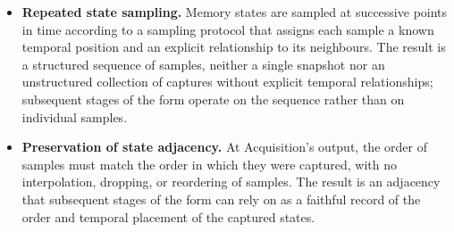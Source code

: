   \begin{itemize}
    \item \textbf{Repeated state sampling.} Memory states are sampled at successive points in time according to a sampling protocol that assigns each sample a known temporal position and an explicit relationship to its neighbours. The result is a structured sequence of samples, neither a single snapshot nor an unstructured collection of captures without explicit temporal relationships; subsequent stages of the form operate on the sequence rather than on individual samples.
    \item \textbf{Preservation of state adjacency.} At Acquisition's output, the order of samples must match the order in which they were captured, with no interpolation, dropping, or reordering of samples. The result is an adjacency that subsequent stages of the form can rely on as a faithful record of the order and temporal placement of the captured states.

\end{itemize}
